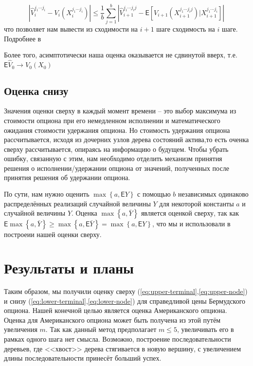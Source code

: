 \documentclass[a4paper,10pt]{article}
\newcommand{\ev}{\mathsf{E}}
\begin{document}
	\begin{equation*}
	\left|\hat{V}_i^{j_1\cdots j_i} - V_i\left(X_i^{j_1 \cdots j_i}\right)\right| \leqslant \frac{1}{b}\sum_{j=1}^b\left|\hat{V}_{i+1}^{j_1 \cdots j_i j} - \ev\left[V_{i+1}\left(X_{i+1}^{j_1\cdots j_i j}\right)|X_{i+1}^{j_1\cdots j_i}\right]\right|
	\end{equation*}
	что позволяет нам вывести из сходимости на $i+1$ шаге сходимость на $i$ шаге. Подробнее в \cite{Broadie1997}
\par Более того, асимптотически наша оценка оказывается не сдвинутой вверх, т.е. $\mathsf{E}\hat{V}_0 \to V_0\left(X_0\right)$
\subsection{Оценка снизу}
\par Значения оценки сверху в каждый момент времени -- это выбор максимума из стоимости опциона при его немедленном исполнении и математического ожидания стоимости удержания опциона. Но стоимость удержания опциона рассчитывается, исходя из дочерних узлов дерева состояний актива,то есть оченка сверху рассчитывается, опираясь на информацию о будущем. Чтобы убрать ошибку, связанную с этим, нам необходимо отделить механизм принятия решения о исполнении/удержании опциона от значений, полученных после принятия решения об удержании опциона.
\par По сути, нам нужно оценить $\max\left\lbrace a, \ev Y \right\rbrace$ с помощью $b$ независимых одинаково распределённых реализаций случайной величины $Y$ для некоторой константы $a$ и случайной величины $Y$. Оценка $\max\left\lbrace a, \bar{Y}\right\rbrace$ является оценкой сверху, так как $\ev\max\left\lbrace a, \bar{Y}\right\rbrace \geqslant \max\left\lbrace a, \ev\bar{Y}\right\rbrace = \max\left\lbrace a, \ev Y\right\rbrace$, что мы и использовали в построеии нашей оценки сверху.
\section{Результаты и планы}
\par Таким образом, мы получили оценку сверху (\eqref{eq:upper-terminal},\eqref{eq:upper-node}) и снизу (\eqref{eq:lower-terminal},\eqref{eq:lower-node}) для справедливой цены Бермудского опциона. Нашей конечной целью является оценка Американского опциона. Оценка для Американского опциона может быть получена из этой путём увеличения $m$. Так как данный метод предполагает $m \leqslant 5$, увеличивать его в рамках одного шага нет смысла. Возможно, построение последовательности деревьев, где <<хвост>> дерева стягивается в новую вершину, с увеличением длины последовательности принесёт больший успех.
\nocite{*}

\end{document}
